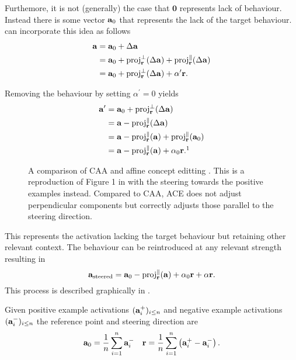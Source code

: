 Furthemore, it is not (generally) the case that $\mathbf{0}$ represents lack of behaviour.
Instead there is some vector $\mathbf{a}_0$ that represents the lack of the target behaviour.
 can incorporate this idea as follows
\begin{align*}
    \mathbf{a} &= \mathbf{a}_0 + \Delta\mathbf{a} \\
        &= \mathbf{a}_0 + \text{proj}_{\mathbf{r}}^{\perp}(\Delta\mathbf{a}) + \text{proj}_{\mathbf{r}}^{\parallel}(\Delta\mathbf{a}) \\
        &= \mathbf{a}_0 + \text{proj}_{\mathbf{r}}^{\perp}(\Delta\mathbf{a}) + \alpha^\prime\mathbf{r}.
\end{align*}

Removing the behaviour by setting $\alpha^\prime = 0$ yields
\begin{align*}
    \va^\prime &= \va_0 + \text{proj}_\vr^{\perp}(\Delta\va) \\
               &= \va - \text{proj}_\vr^{\parallel}(\Delta\va) \\
               &= \va - \text{proj}_\vr^{\parallel}(\va) + \text{proj}_\vr^{\parallel}(\va_0) \\
               &= \va - \text{proj}_\vr^{\parallel}(\va) + \alpha_0\vr.\footnotemark[1]
\end{align*}

\begin{figure}
    \centering
    \captionsetup{width=.9\textwidth}
    
    \caption{A comparison of CAA \citep{caa} and affine concept editting \citep{ace}. This is a reproduction of Figure 1 in \citet{ace} with the steering towards the positive examples instead. Compared to CAA, ACE does not adjust perpendicular components but correctly adjusts those parallel to the steering direction.}
    \label{fig:ace}
\end{figure}

This represents the activation lacking the target behaviour but retaining other relevant context.
The behaviour can be reintroduced at any relevant strength resulting in
\begin{equation}
    \label{eq:ace}
    \mathbf{a}_\text{steered} = \mathbf{a}_0 - \text{proj}_{\mathbf{r}}^{\parallel}(\mathbf{a}) + \alpha_0\mathbf{r} + \alpha\mathbf{r}.
\end{equation}
This process is described graphically in .

Given positive example activations $(\mathbf{a}_i^+)_{i\le n}$ and negative example activations $(\mathbf{a}_i^-)_{i\le n}$ the reference point and steering direction are
\begin{align*}
    \mathbf{a}_0 = \frac{1}{n}\sum_{i=1}^{n}\mathbf{a}_i^- && \mathbf{r} = \frac{1}{n}\sum_{i=1}^{n}\left(\mathbf{a}_i^+ - \mathbf{a}_i^-\right).
\end{align*}

